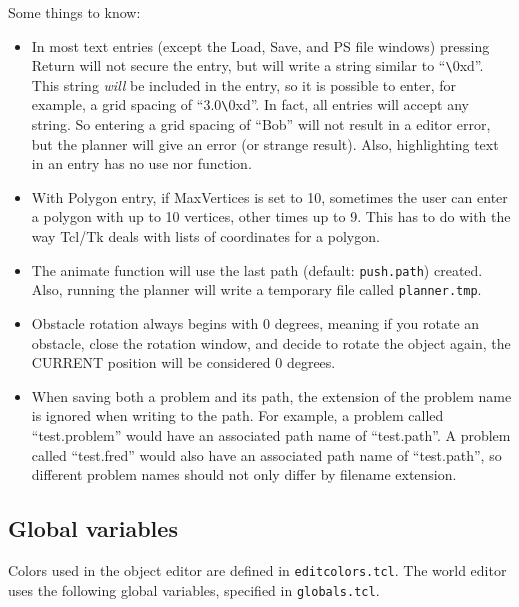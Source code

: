 Some things to know:
\begin{itemize}
\item In most text entries (except the Load, Save, and PS file windows) 
pressing Return will not secure the entry, but will write a string
similar to ``\verb+\+0xd''.  This string {\em will\/} be included in the
entry, so it is possible to enter, for example, a grid spacing of
``3.0\verb+\+0xd''.
In fact, all entries will accept any string.  So entering a grid 
spacing of ``Bob'' will not result
in a editor error, but the planner will give an error (or strange
result).  Also, highlighting text in an entry has no use nor function.

\item With Polygon entry, if MaxVertices is set to 10, sometimes the user 
can enter a polygon with up to 10 vertices, other times up to 9.  This has 
to do with the way Tcl/Tk deals with lists of coordinates for a polygon.

\item The animate function will use the last path (default: {\tt push.path}) 
created.  Also, running the planner will write a temporary file called 
{\tt planner.tmp}.

\item Obstacle rotation always begins with 0 degrees, meaning if you rotate an 
obstacle, close the rotation window, and decide to rotate the object
again, the CURRENT position will be considered 0 degrees.

\item When saving both a problem and its path, the extension of the problem 
name is ignored when writing to the path.  For example, a problem
called ``test.problem'' would have an associated path name of
``test.path''.  A problem called ``test.fred'' would also have an
associated path name of ``test.path'', so different problem names
should not only differ by filename extension.
\end{itemize}

\subsection{Global variables}

Colors used in the object editor are defined in {\tt editcolors.tcl}.
The world editor uses the following global variables, specified in
{\tt globals.tcl}.


